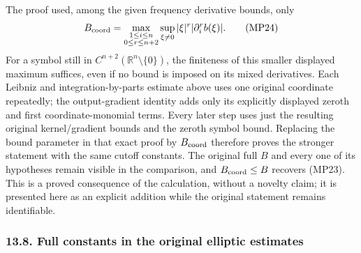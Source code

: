 \documentclass[
  11pt,
]{article}
\makeatletter
\let\ReaderOriginalAnchorStart\hyper@anchorstart
\let\ReaderOriginalAnchorEnd\hyper@anchorend
\let\ReaderPendingAliases\@empty
\def\ReaderArmAliases#1{\gdef\ReaderPendingAliases{#1}}
\def\hyper@anchorstart#1{\ReaderIfNativeAnchorTF{#1}{\ReaderPendingAliases\global\let\ReaderPendingAliases\@empty}{}\ReaderOriginalAnchorStart{#1}}
\makeatother
\begin{document}
The proof used, among the given frequency derivative bounds, only \[
 B_{\rm coord}=\max_{\substack{1\leq i\leq n\\0\leq r\leq n+2}}
         \sup_{\xi\ne0}|\xi|^r|\partial_i^rb(\xi)| .
                                                               \tag{MP24}
\] For a symbol still in \(C^{n+2}(\mathbb R^n\setminus\{0\})\), the
finiteness of this smaller displayed maximum suffices, even if no bound
is imposed on its mixed derivatives. Each Leibniz and
integration-by-parts estimate above uses one original coordinate
repeatedly; the output-gradient identity adds only its explicitly
displayed zeroth and first coordinate-monomial terms. Every later step
uses just the resulting original kernel/gradient bounds and the zeroth
symbol bound. Replacing the bound parameter in that exact proof by
\(B_{\rm coord}\) therefore proves the stronger statement with the same
cutoff constants. The original full \(B\) and every one of its
hypotheses remain visible in the comparison, and \(B_{\rm coord}\leq B\)
recovers (MP23). This is a proved consequence of the calculation,
without a novelty claim; it is presented here as an explicit addition
while the original statement remains identifiable.

\ReaderArmAliases{\ReaderOriginalAnchorStart{AN03-LCE-MULT-008}\ReaderOriginalAnchorEnd\begingroup\expandafter\def\csname @currentHref\endcsname{AN03-LCE-MULT-008}\label{AN03-LCE-MULT-008}\endgroup\ReaderOriginalAnchorStart{full-constants-in-the-original-elliptic-estimates}\ReaderOriginalAnchorEnd}
\subsubsection{13.8. Full constants in the original elliptic
estimates}\label{full-constants-in-the-original-elliptic-estimates}
\end{document}
